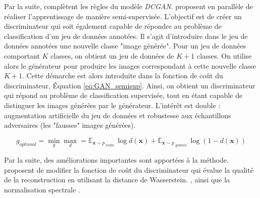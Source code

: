 Par la suite, \citeauthor{salimans_improved_2016} \cite{salimans_improved_2016} complètent les règles du modèle \textit{DCGAN}.
\citeauthor{odena_semisupervised_2016, salimans_improved_2016} \cite{odena_semisupervised_2016, salimans_improved_2016} proposent en parallèle de réaliser l'apprentissage de manière semi-supervisée.
L'objectif est de créer un discriminateur qui soit également capable de répondre au problème de classification d'un jeu de données annotées.
Il s'agit d'introduire dans le jeu de données annotées une nouvelle classe "image générée".
Pour un jeu de données comportant $K$ classes, on obtient un jeu de données de $K+1$ classes.
On utilise alors le générateur pour produire les images correspondant à cette nouvelle classe $K+1$.
Cette démarche est alors introduite dans la fonction de coût du discriminateur, Équation \ref{eq:GAN_semisup}.
Ainsi, on obtient un discriminateur qui répond au problème de classification supervisée, tout en étant capable de distinguer les images générées par le générateur.
L'intérêt est double : augmentation artificielle du jeu de données et robustesse aux échantillons adversaires (les "fausses" images générées).

\begin{equation} \label{eq:GAN_semisup}
g_{optimal}  = \min _{g} \max _{d} = \mathbb{E}_{\mathbf{x} \sim p_{\text { réelle }}} \log d(\boldsymbol{x})+\mathbb{E}_{\boldsymbol{x} \sim p_{\text { générée }}} \log (1-d(\boldsymbol{x}))
\end{equation}

Par la suite, des améliorations importantes sont apportées à la méthode.
\citeauthor{arjovsky_wasserstein_2017} \cite{arjovsky_wasserstein_2017} proposent de modifier la fonction de coût du discriminateur qui évalue la qualité de la reconstruction en utilisant la distance de Wasserstein.
\cite{gulrajani_improved_2017}, ainsi que la normalisation spectrale \cite{miyato_spectral_2018}.

